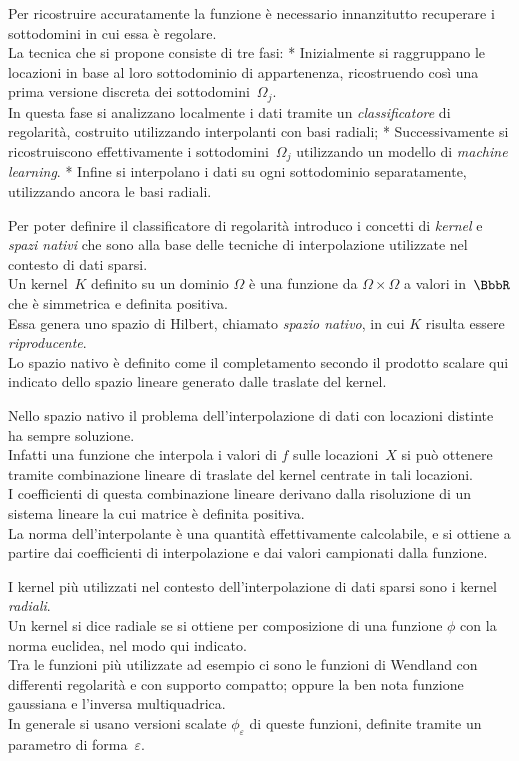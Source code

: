 \rf Per ricostruire accuratamente la funzione è necessario innanzitutto  recuperare i sottodomini in cui essa è regolare.\\
La tecnica che si propone consiste di tre fasi:
\begitems
* Inizialmente si raggruppano le locazioni in base al loro sottodominio di appartenenza, ricostruendo così una prima versione discreta dei sottodomini~$\Omega_j$.\\
In questa fase si analizzano localmente i dati tramite un {\em classificatore} di regolarità, costruito utilizzando interpolanti con basi radiali;
* Successivamente si ricostruiscono effettivamente i sottodomini~$\Omega_j$ utilizzando un modello di {\em machine learning}.
* Infine si interpolano i dati su ogni sottodominio separatamente, utilizzando ancora le basi radiali.
\enditems


\rf Per poter definire il classificatore di regolarità introduco i concetti di {\em kernel} e {\em spazi nativi} che sono alla base delle tecniche di interpolazione utilizzate nel contesto di dati sparsi.\\
Un kernel~$K$ definito su un dominio $\Omega$  è una funzione da $\Omega{\times}\Omega$ a valori in~$\R$ che è simmetrica e definita positiva.\\  Essa genera uno spazio di Hilbert, chiamato {\em spazio nativo}, in cui $K$ risulta essere {\em riproducente}.\\
Lo spazio nativo è definito come il completamento  secondo il prodotto scalare qui  indicato dello spazio lineare generato dalle traslate del kernel.



\rf Nello spazio nativo il problema dell'interpolazione di dati con locazioni distinte ha sempre soluzione.\\
Infatti una funzione che interpola i valori di $f$ sulle locazioni~$X$ si può ottenere tramite combinazione lineare di traslate del kernel centrate in tali locazioni.\\
I coefficienti di questa combinazione lineare derivano dalla risoluzione di un sistema lineare la cui matrice è definita positiva.\\
 La norma dell’interpolante  è una quantità effettivamente calcolabile, e si ottiene a partire dai coefficienti di interpolazione e dai valori campionati dalla funzione.





\rf I kernel più utilizzati nel contesto dell'interpolazione di dati sparsi sono i kernel {\em radiali}.\\
Un kernel si dice radiale se si ottiene per composizione di una funzione $\phi$ con la norma euclidea, nel modo qui indicato.\\  
Tra le funzioni più utilizzate ad esempio ci sono le funzioni di Wendland con differenti regolarità e con supporto compatto; oppure la ben nota funzione gaussiana e l'inversa multiquadrica.\\
In generale si usano versioni scalate $\phi_\varepsilon$ di queste funzioni, definite tramite un parametro di forma~$\varepsilon$.



